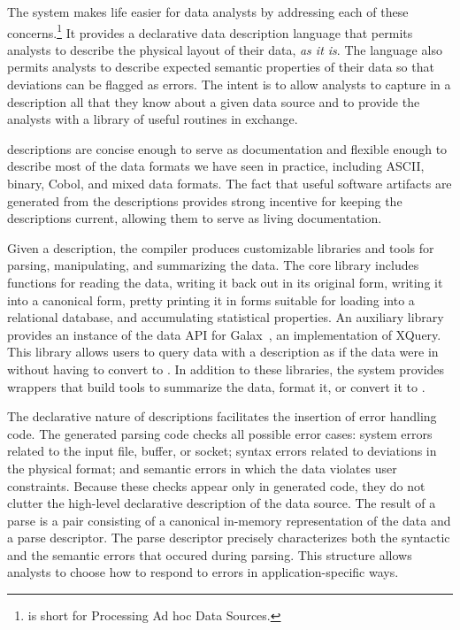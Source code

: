 \documentclass{sig-alternate}
\begin{document}
The \pads{} system makes life easier for data analysts by addressing
each of these concerns.\footnote{
  \pads{} is short for Processing Ad hoc Data Sources.
}
It provides a declarative data description
language that permits analysts to describe the physical layout of
their data, \textit{as it is}.  The language also permits analysts to
describe expected semantic properties of their data so that deviations can
be flagged as errors. The intent is to allow analysts to capture in a
\pads{} description all that they know about a given data source
and to provide the analysts with a library of useful routines in exchange. 


\pads{} descriptions are concise enough to
serve as documentation and flexible enough to describe most of
the data formats we have seen in practice, including ASCII, binary,
Cobol, and mixed data formats.  The fact that useful software
artifacts are generated from the descriptions provides strong
incentive for keeping the descriptions current, allowing them to serve
as living documentation.  

Given a \pads{} description, the \pads{} compiler produces customizable \C{} libraries
and tools for parsing, manipulating, and summarizing the data. 
The core \C{} library includes functions for reading the data, writing it 
back out in its original form, writing it into a canonical \xml{} form, pretty printing
it in forms suitable for loading into a relational database, and accumulating  
statistical properties.  An auxiliary library provides 
an instance of the data API for Galax~\cite{galax,galaxmanual}, an implementation of XQuery.  This 
library allows users to query data with a \pads{} description as if the data were
in \xml{} without having to convert to \xml{}.  In addition to these libraries,
the \pads{} system provides wrappers that build tools to 
summarize the data, format it,  or convert it to \xml{}.

The declarative nature of \pads{} descriptions facilitates the
insertion of error handling code.
The generated parsing code checks all possible error cases: system
errors related to the input file, buffer, or socket; syntax errors
related to deviations in the physical format; and semantic errors in
which the data violates user constraints.  Because these checks appear
only in generated code, they do not clutter the high-level declarative
description of the data source.
The result of a parse is a pair consisting of a canonical in-memory
representation of the data and a parse descriptor. The parse
descriptor precisely characterizes both the syntactic and the semantic
errors that occured during parsing.  This structure allows analysts
to choose how to respond to errors in application-specific ways.  
\end{document}
